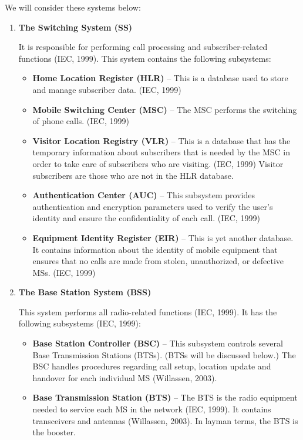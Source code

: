 \documentclass[12pt,svgnames,smaller]{article} %
\begin{document}
	We will consider these systems below:
	
	\begin{enumerate}
		
		\item \textbf{ The Switching System (SS)}
		
		It is responsible for performing call processing and subscriber-related functions (IEC, 1999). This system contains the following subsystems:
		
		\begin{itemize}
			\item \textbf{Home Location Register (HLR)} – This is a database used to store and manage subscriber data. (IEC, 1999)
			\item \textbf{Mobile Switching Center (MSC)} – The MSC performs the switching of phone calls. (IEC, 1999)
			\item \textbf{Visitor Location Registry (VLR)} – This is a database that has the temporary information about subscribers that is needed by the MSC in order to take care of subscribers who are visiting. (IEC, 1999) Visitor subscribers are those who are not in the HLR database. 
			\item \textbf{Authentication Center (AUC)} – This subsystem provides authentication and encryption parameters used to verify the user’s identity and ensure the confidentiality of each call. (IEC, 1999)
			\item \textbf{Equipment Identity Register (EIR)} – This is yet another database. It contains information about the identity of mobile equipment that ensures that no calls are made from stolen, unauthorized, or defective MSs. (IEC, 1999)
		\end{itemize}
		
		
		\item \textbf{ The Base Station System (BSS)}
		
		This system performs all radio-related functions (IEC, 1999).  It has the following subsystems (IEC, 1999):
		
		\begin{itemize}
			\item \textbf{Base Station Controller (BSC)} – This subsystem controls several Base Transmission Stations (BTSs). (BTSs will be discussed below.) The BSC handles procedures regarding call setup, location update and handover for each individual MS (Willassen, 2003).
			\item \textbf{Base Transmission Station (BTS)} – The BTS is the radio equipment needed to service each MS in the network (IEC, 1999). It contains transceivers and antennas (Willassen, 2003). In layman terms, the BTS is the booster. 
		\end{itemize}
		

\end{enumerate}
\end{document}
